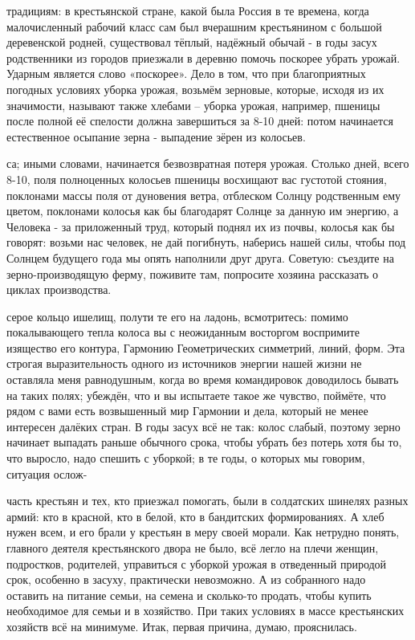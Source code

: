 традициям: в крестьянской стране, какой была Россия в те времена, когда малочисленный рабочий класс сам был вчерашним крестьянином с большой деревенской родней, существовал тёплый, надёжный обычай - в годы засух родственники из городов приезжали в деревню помочь поскорее убрать урожай. Ударным является слово «поскорее». Дело в том, что при благоприятных погодных условиях уборка урожая, возьмём зерновые, которые, исходя из их значимости, называют также хлебами – уборка урожая, например, пшеницы после полной её спелости должна завершиться за 8-10 дней: потом начинается естественное осыпание зерна - выпадение зёрен из колосьев.

са; иными словами, начинается безвозвратная потеря урожая. Столько дней, всего 8-10, поля полноценных колосьев пшеницы восхищают вас густотой стояния, поклонами массы поля от дуновения ветра, отблеском Солнцу родственным ему цветом, поклонами колосья как бы благодарят Солнце за данную им энергию, а Человека - за приложенный труд, который поднял их из почвы, колосья как бы говорят: возьми нас человек, не дай погибнуть, наберись нашей силы, чтобы под Солнцем будущего года мы опять наполнили друг друга. Советую: съездите на зерно-производящую ферму, поживите там, попросите хозяина рассказать о циклах производства.

серое кольцо ишелищ, полути те его на ладонь, всмотритесь: помимо покалывающего тепла колоса вы с неожиданным восторгом воспримите изящество его контура, Гармонию Геометрических симметрий, линий, форм. Эта строгая выразительность одного из источников энергии нашей жизни не оставляла меня равнодушным, когда во время командировок доводилось бывать на таких полях; убеждён, что и вы испытаете такое же чувство, поймёте, что рядом с вами есть возвышенный мир Гармонии и дела, который не менее интересен далёких стран. В годы засух всё не так: колос слабый, поэтому зерно начинает выпадать раньше обычного срока, чтобы убрать без потерь хотя бы то, что выросло, надо спешить с уборкой; в те годы, о которых мы говорим, ситуация ослож-

часть крестьян и тех, кто приезжал помогать, были в солдатских шинелях разных армий: кто в красной, кто в белой, кто в бандитских формированиях. А хлеб нужен всем, и его брали у крестьян в меру своей морали. Как нетрудно понять, главного деятеля крестьянского двора не было, всё легло на плечи женщин, подростков, родителей, управиться с уборкой урожая в отведенный природой срок, особенно в засуху, практически невозможно. А из собранного надо оставить на питание семьи, на семена и сколько-то продать, чтобы купить необходимое для семьи и в хозяйство. При таких условиях в массе крестьянских хозяйств всё на минимуме. Итак, первая причина, думаю, прояснилась.

